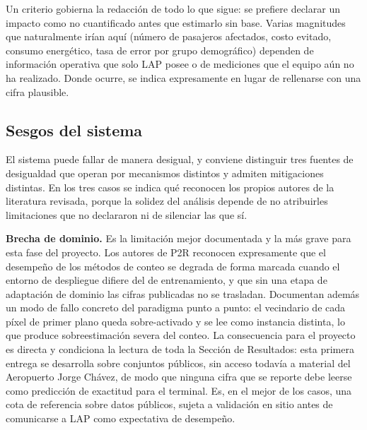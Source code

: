 Un criterio gobierna la redacción de todo lo que sigue: se prefiere
declarar un impacto como no cuantificado antes que estimarlo sin base.
Varias magnitudes que naturalmente irían aquí (número de pasajeros
afectados, costo evitado, consumo energético, tasa de error por grupo
demográfico) dependen de información operativa que solo LAP posee o de
mediciones que el equipo aún no ha realizado. Donde ocurre, se indica
expresamente en lugar de rellenarse con una cifra plausible.

\subsection{Sesgos del sistema}

El sistema puede fallar de manera desigual, y conviene distinguir tres
fuentes de desigualdad que operan por mecanismos distintos y admiten
mitigaciones distintas. En los tres casos se indica qué reconocen los
propios autores de la literatura revisada, porque la solidez del
análisis depende de no atribuirles limitaciones que no declararon ni de
silenciar las que sí.

\textbf{Brecha de dominio.} Es la limitación mejor documentada y la más
grave para esta fase del proyecto. Los autores de P2R
\cite{Lin_2025_CVPR} reconocen expresamente que el desempeño de los
métodos de conteo se degrada de forma marcada cuando el entorno de
despliegue difiere del de entrenamiento, y que sin una etapa de
adaptación de dominio las cifras publicadas no se trasladan. Documentan
además un modo de fallo concreto del paradigma punto a punto: el
vecindario de cada píxel de primer plano queda sobre-activado y se lee
como instancia distinta, lo que produce sobreestimación severa del
conteo. La consecuencia para el proyecto es directa y condiciona la
lectura de toda la Sección de Resultados: esta primera entrega se
desarrolla sobre conjuntos públicos, sin acceso todavía a material del
Aeropuerto Jorge Chávez, de modo que ninguna cifra que se reporte debe
leerse como predicción de exactitud para el terminal. Es, en el mejor de
los casos, una cota de referencia sobre datos públicos, sujeta a
validación en sitio antes de comunicarse a LAP como expectativa de
desempeño.

